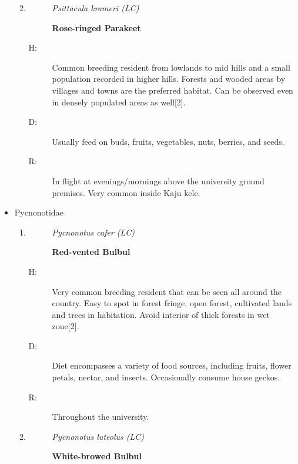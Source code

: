\begin{itemize}
\begin{enumerate}
\begin{description}
\end{description}%
\item%
\begin{description}%
\item[]%
\textit{Psittacula krameri (LC)}%
\item[]%
\textbf{Rose{-}ringed Parakeet}%
\end{description}%
\begin{description}%
\item[H: ]%
Common breeding resident from lowlands to mid hills and a small population recorded in higher hills. Forests and wooded areas by villages and towns are the preferred habitat. Can be observed even in densely populated areas as well{[}2{]}.%
\item[D: ]%
Usually feed on buds, fruits, vegetables, nuts, berries, and seeds.%
\item[R: ]%
In flight at evenings/mornings above the university ground premises. Very common inside Kaju kele.%
\end{description}%
\end{enumerate}%
\item%
Pycnonotidae%
\begin{enumerate}%
\item%
\begin{description}%
\item[]%
\textit{Pycnonotus cafer (LC)}%
\item[]%
\textbf{Red{-}vented Bulbul}%
\end{description}%
\begin{description}%
\item[H: ]%
Very common breeding resident that can be seen all around the country. Easy to spot in forest fringe, open forest, cultivated lands and trees in habitation.  Avoid interior of thick forests in wet zone{[}2{]}.%
\item[D: ]%
Diet encompasses a variety of food sources, including fruits, flower petals, nectar, and insects. Occasionally consume house geckos.%
\item[R: ]%
Throughout the university.%
\end{description}%
\item%
\begin{description}%
\item[]%
\textit{Pycnonotus luteolus (LC)}%
\item[]%
\textbf{White{-}browed Bulbul}%
\end{description}%
\begin{description}%

\end{description}
\end{enumerate}
\end{itemize}
